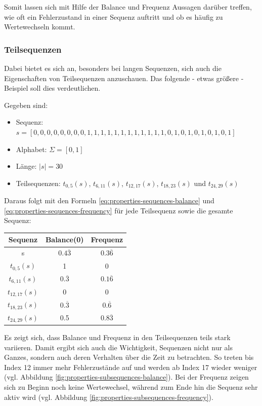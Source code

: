 Somit lassen sich mit Hilfe der Balance und Frequenz Aussagen darüber treffen, wie oft ein Fehlerzustand in einer Sequenz auftritt und ob es häufig zu Wertewechseln kommt. 

\subsubsection{Teilsequenzen}

Dabei bietet es sich an, besonders bei langen Sequenzen, sich auch die Eigenschaften von Teilsequenzen anzuschauen. Das folgende - etwas größere - Beispiel soll dies verdeutlichen.

\begin{theorem}
	Gegeben sind:
	\begin{itemize}[noitemsep]
		\item Sequenz: $s = [0,0,0,0,0,0,0,0,1,1,1,1,1,1,1,1,1,1,1,1,0,1,0,1,0,1,0,1,0,1]$
		\item Alphabet: $\Sigma = [0,1]$
		\item Länge: $|s| = 30$
		\item Teilsequenzen: $t_{0,5}(s)$, $t_{6,11}(s)$, $t_{12,17}(s)$, $t_{18,23}(s)$ und $t_{24,29}(s)$
	\end{itemize}
	Daraus folgt mit den Formeln \ref{eq:properties-sequences-balance} und \ref{eq:properties-sequences-frequency} für jede Teilsequenz sowie die gesamte Sequenz:
	
	\begin{center}
		\begin{tabular}{|c c c|}
			\hline
			Sequenz & Balance(0) & Frequenz \\
			\hline\hline
			s & $0.4\overline{3}$ & $0.3\overline{6}$ \\ 
			\hline
			$t_{0,5}(s)$ & 1 & 0 \\ 
			\hline
			$t_{6,11}(s)$ & $0.\overline{3}$ & $0.1\overline{6}$ \\
			\hline
			$t_{12,17}(s)$ & 0 & 0 \\
			\hline
			$t_{18,23}(s)$ & $0.\overline{3}$ & $0.\overline{6}$ \\
			\hline
			$t_{24,29}(s)$ & 0.5 & $0.8\overline{3}$ \\
			\hline
		\end{tabular}
	\end{center}
	
	Es zeigt sich, dass Balance und Frequenz in den Teilsequenzen teils stark variieren. Damit ergibt sich auch die Wichtigkeit, Sequenzen nicht nur als Ganzes, sondern auch deren Verhalten über die Zeit zu betrachten. So treten bis Index 12 immer mehr Fehlerzustände auf und werden ab Index 17 wieder weniger (vgl. Abbildung \ref{fig:properties-subsequences-balance}). Bei der Frequenz zeigen sich zu Beginn noch keine Wertewechsel, während zum Ende hin die Sequenz sehr aktiv wird (vgl. Abbildung \ref{fig:properties-subsequences-frequency}).
	

\end{theorem}
